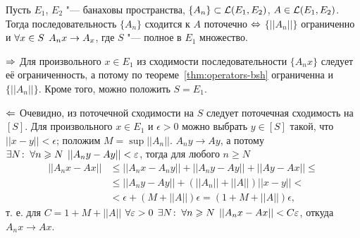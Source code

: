 \documentclass[main]{subfiles}
\begin{document}
\begin{theorem} %
  Пусть \( E_1 \), \( E_2 \) "--- банаховы пространства,
  \( \{ A_n \} \subset \Linears{E_1}[E_2] \),
  \( A \in \Linears{E_1}[E_2] \).
  Тогда последовательность \( \{ A_n \} \) сходится
  к \( A \) поточечно \( \Leftrightarrow \)
  \( \{ ||A_n|| \} \) ограниченно и \( \forall {x \in S} \; \,
  A_n x \to A_x \),
  где \( S \) "--- полное в \( E_1 \) множество.
\end{theorem}
\begin{itemproof}
  \item[\( \Rightarrow \)]
    Для произвольного \( x \in E_1 \)
    из сходимости последовательности
    \( \{ A_n x \} \) следует её ограниченность,
    а потому по теореме~\ref{thm:operators-bsh}
    ограниченна и \( \{ ||A_n|| \} \).
    Кроме того, можно положить \( S = E_1 \).
  \item[\( \Leftarrow \)]
    Очевидно, из поточечной сходимости
    на \( S \) следует поточечная сходимость
    на \( [S] \).
    Для произвольного \( x \in E_1 \) и \( \epsilon > 0 \)
    можно выбрать \( y \in [S] \) такой,
    что \( ||x - y|| < \epsilon \);
    положим \( M = \sup ||A_n|| \).
    \( A_n y \to A y \), а потому
    \( \exists N \colon \: \forall {n \geqslant N} \; \, ||A_n y - A y|| < \varepsilon \),
    тогда для любого \( n \ge N \)
    \begin{align}
      ||A_n x - A x|| &\le
      ||A_n x - A_n y|| + ||A_n y - A y|| + ||A y - A x|| \le \\
      &\le ||A_n y - A y|| + (||A_n|| + ||A||) ||x - y|| < \\
      &< \epsilon + (M  + ||A||) \epsilon =
      (1 + M + ||A||) \epsilon,
    \end{align}
    т. е. для \( C = 1 + M + ||A|| \)
    \( \forall {\varepsilon> 0} \; \, \exists N \colon \:
    \forall {n \geqslant N} \; \, ||A_n x - A x|| < C \varepsilon \),
    откуда \( A_n x \to A x \).
\end{itemproof}
\end{document}
